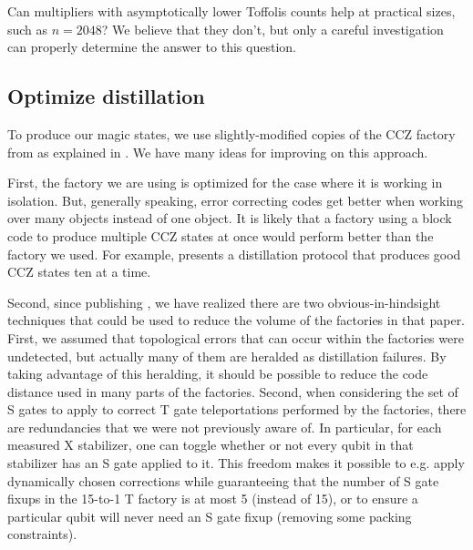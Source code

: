 \documentclass[superscriptaddress,notitlepage,longbibliography]{revtex4-1}
\theoremstyle{definition}
\theoremstyle{definition}
\begin{document}
Can multipliers with asymptotically lower Toffolis counts help at practical sizes, such as $n=2048$?
We believe that they don't, but only a careful investigation can properly determine the answer to this question.



\subsection{Optimize distillation}

To produce our magic states, we use slightly-modified copies of the CCZ factory from \cite{gidney2018magic} as explained in \cite{gidney2019autoccz}.
We have many ideas for improving on this approach.

First, the factory we are using is optimized for the case where it is working in isolation.
But, generally speaking, error correcting codes get better when working over many objects instead of one object.
It is likely that a factory using a block code to produce multiple CCZ states at once would perform better than the factory we used.
For example, \cite{haah2018codes} presents a distillation protocol that produces good CCZ states ten at a time.

Second, since publishing \cite{gidney2018magic}, we have realized there are two obvious-in-hindsight techniques that could be used to reduce the volume of the factories in that paper.
First, we assumed that topological errors that can occur within the factories were undetected, but actually many of them are heralded as distillation failures.
By taking advantage of this heralding, it should be possible to reduce the code distance used in many parts of the factories.
Second, when considering the set of S gates to apply to correct T gate teleportations performed by the factories, there are redundancies that we were not previously aware of.
In particular, for each measured X stabilizer, one can toggle whether or not every qubit in that stabilizer has an S gate applied to it.
This freedom makes it possible to e.g. apply dynamically chosen corrections while guaranteeing that the number of S gate fixups in the 15-to-1 T factory is at most 5 (instead of 15), or to ensure a particular qubit will never need an S gate fixup (removing some packing constraints).
\end{document}
